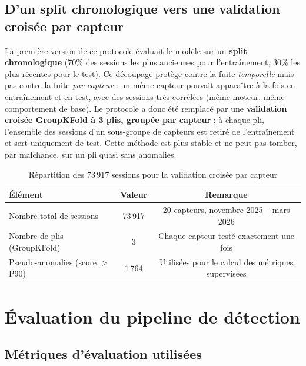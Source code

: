 \documentclass[12pt,a4paper]{report}
\begin{document}
\subsection{D'un split chronologique vers une validation croisée par capteur}
\label{subsec:groupkfold}

\begin{correctionbox}
La première version de ce protocole évaluait le modèle sur un \textbf{split chronologique}
(70\% des sessions les plus anciennes pour l'entraînement, 30\% les plus récentes pour le
test). Ce découpage protège contre la fuite \textit{temporelle} mais pas contre la fuite
\textit{par capteur} : un même capteur pouvait apparaître à la fois en entraînement et en
test, avec des sessions très corrélées (même moteur, même comportement de base). Le
protocole a donc été remplacé par une \textbf{validation croisée GroupKFold à 3 plis, groupée
par capteur} : à chaque pli, l'ensemble des sessions d'un sous-groupe de capteurs est
retiré de l'entraînement et sert uniquement de test. Cette méthode est plus stable et ne
peut pas tomber, par malchance, sur un pli quasi sans anomalies.
\end{correctionbox}

\begin{table}[H]
\centering
\caption{Répartition des 73\,917 sessions pour la validation croisée par capteur}
\begin{tabular}{lcc}
\toprule
\textbf{Élément} & \textbf{Valeur} & \textbf{Remarque} \\
\midrule
Nombre total de sessions        & 73\,917 & 20 capteurs, novembre 2025 -- mars 2026 \\
Nombre de plis (GroupKFold)     & 3       & Chaque capteur testé exactement une fois \\
Pseudo-anomalies (score $>$ P90) & 1\,764  & Utilisées pour le calcul des métriques supervisées \\
\bottomrule
\end{tabular}
\end{table}




\section{Évaluation du pipeline de détection}

\subsection{Métriques d'évaluation utilisées}
\end{document}
